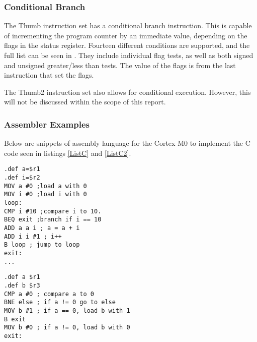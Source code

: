 \documentclass[12pt,a4paper]{article}
\begin{document}
\begin{bibunit}[is-unsrt]
\subsubsection{Conditional Branch}\label{arm:conditionalbranch}
The Thumb instruction set has a conditional branch instruction.
This is capable of incrementing the program counter by an immediate value, depending on the flags in the status register.
Fourteen different conditions are supported, and the full list can be seen in \cite{ARM:Thumb}.
They include individual flag tests, as well as both signed and unsigned greater/less than tests.
The value of the flags is from the last instruction that set the flags.%

The Thumb2 instruction set also allows for conditional execution. 
However, this will not be discussed within the scope of this report.

\subsubsection{Assembler Examples}
Below are snippets of assembly language for the Cortex M0 to implement the C code seen in listings \ref{ListC} and \ref{ListC2}.
%  
\begin{lstlisting}[frame=single,caption=Thumb/Thumb2 Assembler for code in listing \ref{ListC},label=ARM1]
.def a=$r1
.def i=$r2
MOV a #0 ;load a with 0
MOV i #0 ;load i with 0
loop:
CMP i #10 ;compare i to 10.
BEQ exit ;branch if i == 10
ADD a a i ; a = a + i 
ADD i i #1 ; i++ 
B loop ; jump to loop 
exit: 
...
\end{lstlisting}


\begin{lstlisting}[frame=single,caption=Thumb/Thumb2 Assembler for code in listing \ref{ListC2},label=ARM2]
.def a $r1
.def b $r3
CMP a #0 ; compare a to 0
BNE else ; if a != 0 go to else
MOV b #1 ; if a == 0, load b with 1
B exit
MOV b #0 ; if a != 0, load b with 0
exit:
\end{lstlisting}
%  


\end{bibunit}
\end{document}
